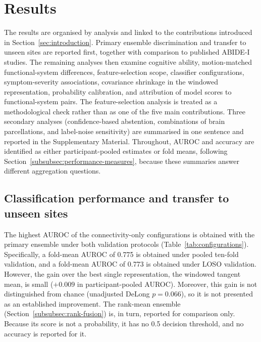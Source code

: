 \section{Results}
\label{sec:results}

The results are organised by analysis and linked to the contributions introduced in Section~\ref{sec:introduction}. Primary ensemble discrimination and transfer to unseen sites are reported first, together with comparison to published ABIDE-I studies. The remaining analyses then examine cognitive ability, motion-matched functional-system differences, feature-selection scope, classifier configurations, symptom-severity associations, covariance shrinkage in the windowed representation, probability calibration, and attribution of model scores to functional-system pairs. The feature-selection analysis is treated as a methodological check rather than as one of the five main contributions. Three secondary analyses (confidence-based abstention, combinations of brain parcellations, and label-noise sensitivity) are summarised in one sentence and reported in the Supplementary Material. Throughout, AUROC and accuracy are identified as either participant-pooled estimates or fold means, following Section~\ref{subsubsec:performance-measures}, because these summaries answer different aggregation questions.

\subsection{Classification performance and transfer to unseen sites}
\label{subsec:results-performance}

The highest AUROC of the connectivity-only configurations is obtained with the primary
ensemble under both validation protocols (Table~\ref{tab:configurations}). Specifically, a
fold-mean AUROC of 0.775 is obtained under pooled ten-fold validation, and a fold-mean
AUROC of 0.773 is obtained under LOSO validation. However, the gain over the
best single representation, the windowed tangent mean, is small ($+0.009$ in
participant-pooled AUROC).
Moreover, this gain is not distinguished from chance (unadjusted DeLong $p=0.066$), so it
is not presented as an established improvement. The rank-mean ensemble
(Section~\ref{subsubsec:rank-fusion}) is, in turn, reported for comparison only. Because its score is
not a probability, it has no 0.5 decision threshold, and no accuracy is reported for it.

